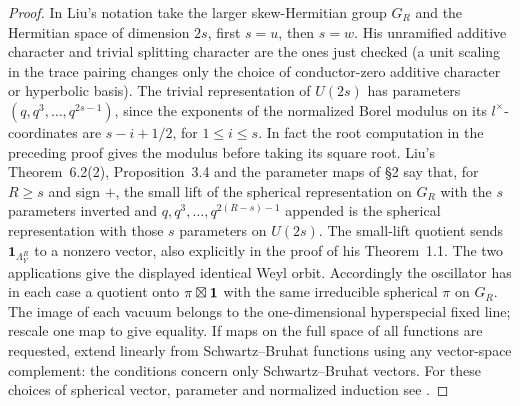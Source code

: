 \begin{proof}
In Liu's notation take the larger skew-Hermitian group \(G_R\) and
the Hermitian space of dimension \(2s\), first \(s=u\), then \(s=w\).
His unramified additive character and trivial splitting character are
the ones just checked (a unit scaling in the trace pairing changes
only the choice of conductor-zero additive character or hyperbolic
basis). The trivial representation of \(U(2s)\) has parameters
\((q,q^3,\ldots,q^{2s-1})\), since the exponents of the normalized
Borel modulus on its \(l^\times\)-coordinates are
\(s-i+1/2\), for \(1\le i\le s\). In fact the root computation in
the preceding proof gives the modulus before taking its square root.
Liu's Theorem~6.2(2), Proposition~3.4 and the parameter maps of
\S2 say that, for \(R\ge s\) and sign \(+\), the small lift of the
spherical representation on \(G_R\) with the \(s\) parameters inverted
and \(q,q^3,\ldots,q^{2(R-s)-1}\) appended is the spherical
representation with those \(s\) parameters on \(U(2s)\).
The small-lift quotient sends \(\mathbf1_{\Lambda_Y^R}\) to a
nonzero vector, also explicitly in the proof of his Theorem~1.1.
The two applications give the displayed identical Weyl orbit.
Accordingly the oscillator has in each case a quotient onto
\(\pi\boxtimes{\bf1}\) with the same irreducible spherical \(\pi\)
on \(G_R\). The image of each vacuum belongs to the one-dimensional
hyperspecial fixed line; rescale one map to give equality. If maps
on the full space of all functions are requested, extend linearly
from Schwartz--Bruhat functions using any vector-space complement:
the conditions concern only Schwartz--Bruhat vectors.
For these choices of spherical vector, parameter and normalized
induction see \cite[\S\S2, 3 and 6]{liuThetaInert}.
\end{proof}

